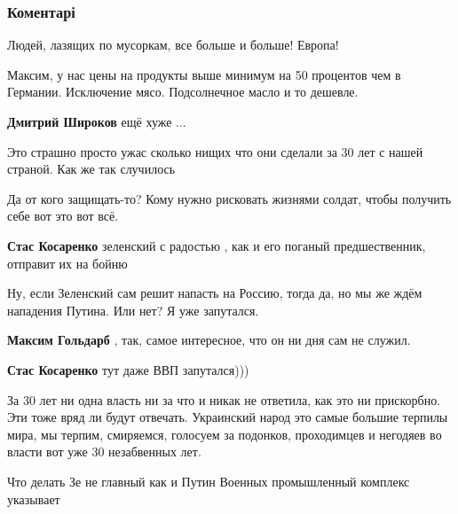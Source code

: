  
 
 
 
 
\subsubsection{Коментарі}

\begin{itemize} %
Людей, лазящих по мусоркам, все больше и больше! Европа!

Максим, у нас цены на продукты выше минимум на 50 процентов чем в Германии. Исключение мясо. Подсолнечное масло и то дешевле.

\textbf{Дмитрий Широков} ещё хуже ...

Это страшно просто ужас сколько нищих что они сделали за 30 лет с нашей страной. Как же так случилось

Да от кого защищать-то? Кому нужно рисковать жизнями солдат, чтобы получить себе вот это вот всё.

\begin{itemize} %
\textbf{Стас Косаренко} зеленский с радостью , как и его поганый предшественник, отправит их на бойню

Ну, если Зеленский сам решит напасть на Россию, тогда да, но мы же ждём нападения Путина. Или нет? Я уже запутался.

\textbf{Максим Гольдарб} , так, самое интересное, что он ни дня сам не служил.

\textbf{Стас Косаренко} тут даже ВВП запутался)))
\end{itemize} %


За 30 лет ни одна власть ни за что и никак не ответила, как это ни прискорбно.
Эти тоже вряд ли будут отвечать. Украинский народ это самые большие терпилы
мира, мы терпим, смиряемся, голосуем за подонков, проходимцев и негодяев во
власти вот уже 30 незабвенных лет.

Что делать Зе не главный как и Путин Военных промышленный комплекс указывает


\end{itemize}
